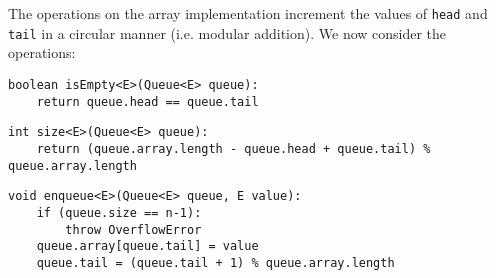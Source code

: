 \documentclass[a4paper, openany]{memoir}
\begin{document}
\noindent The operations on the array implementation increment the values of \texttt{head} and \texttt{tail} in a circular manner (i.e. modular addition). We now consider the operations:
\begin{lstlisting}[language=pseudocode]
boolean isEmpty<E>(Queue<E> queue):
    return queue.head == queue.tail
\end{lstlisting}

\begin{lstlisting}[language=pseudocode]
int size<E>(Queue<E> queue):
    return (queue.array.length - queue.head + queue.tail) % queue.array.length
\end{lstlisting}

\begin{lstlisting}[language=pseudocode]
void enqueue<E>(Queue<E> queue, E value):
    if (queue.size == n-1):
        throw OverflowError
    queue.array[queue.tail] = value
    queue.tail = (queue.tail + 1) % queue.array.length
\end{lstlisting}
\end{document}
